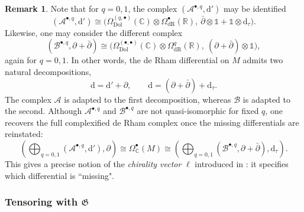 \documentclass[11pt]{amsart}
\newcommand{\fG}{\mathfrak{G}}
\numberwithin{equation}{section}
\numberwithin{figure}{section}
\numberwithin{table}{section}
\renewcommand{\d}{\mathrm{d}}
\theoremstyle{thm}
\numberwithin{equation}{subsection}
\theoremstyle{definition}
\theoremstyle{rem}
\newtheorem{remark}{Remark}
\begin{document}
\begin{remark}
\label{split}
Note that for \(q=0,1\), the complex \((\mathcal A^{\bullet,q},\d')\) may be identified
\begin{equation}
\label{ec:bicomplexA}
(\mathcal A^{\bullet,q},\d')
\cong
\bigl(\Omega^{(q,\bullet)}_{\mathrm{Dol}}(\mathbb C)\otimes \Omega^\bullet_{\mathrm{dR}}(\mathbb R),\ \bar\partial\otimes \mathbb 1+\mathbb 1\otimes \d_\tau\bigr).
\end{equation}
Likewise, one may consider the different complex
\begin{equation}
\label{ec:bicomplexB}
(\mathcal B^{\bullet,q},\partial+\bar\partial)
\cong
\bigl(\Omega^{(\bullet,\bullet)}_{\mathrm{Dol}}(\mathbb C)\otimes \Omega^q_{\mathrm{dR}}(\mathbb R),\ (\partial+\bar\partial)\otimes \mathbb 1\bigr),
\end{equation}
again for \(q=0,1\). In other words, the de Rham differential on $M$ admits two natural decompositions,
\begin{equation}
\d=\d'+\partial,
\qquad
\d=(\partial+\bar\partial)+\d_\tau.
\end{equation}
The complex \(\mathcal A\) is adapted to the first decomposition, whereas \(\mathcal B\) is adapted to the second. Although \(\mathcal A^{\bullet,q}\) and \(\mathcal B^{\bullet,q}\) are not quasi-isomorphic for fixed \(q\), one recovers the full complexified de Rham complex once the missing differentials are reinstated:
\begin{equation}
\left(\bigoplus_{q=0,1}(\mathcal A^{\bullet,q},\d'),\partial\right)
\cong
\Omega^\bullet_{\mathbb C}(M)
\cong
\left(\bigoplus_{q=0,1}(\mathcal B^{\bullet,q},\partial+\bar\partial),\d_\tau\right).
\end{equation}
This gives a precise notion of the \textit{chirality vector} $\ell$ introduced in \cite{Chen:2024axr}: it specifies which differential is ``missing". 
    
\end{remark}


\subsubsection{Tensoring with $\fG$}
\end{document}
